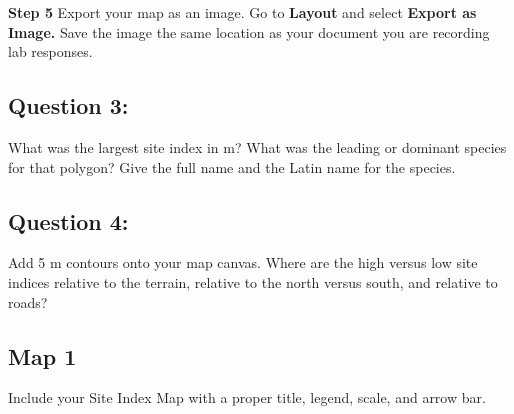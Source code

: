 \documentclass[
  letterpaper,
]{book}
\begin{document}
\textbf{Step 5} Export your map as an image. Go to \textbf{Layout} and
select \textbf{Export as Image.} Save the image the same location as
your document you are recording lab responses.

\hypertarget{question-3}{%
\subsection*{Question 3:}\label{question-3}}

What was the largest site index in m? What was the leading or dominant
species for that polygon? Give the full name and the Latin name for the
species.

\hypertarget{question-4}{%
\subsection*{Question 4:}\label{question-4}}

Add 5 m contours onto your map canvas. Where are the high versus low
site indices relative to the terrain, relative to the north versus
south, and relative to roads?

\hypertarget{map-1}{%
\subsection*{Map 1}\label{map-1}}

Include your Site Index Map with a proper title, legend, scale, and
arrow bar.
\end{document}
